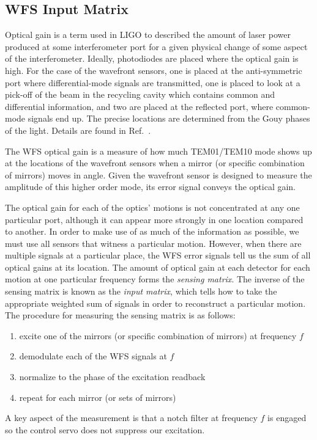 


\subsection{WFS Input Matrix}
Optical gain is a term used in LIGO to described the amount of laser
power produced at some interferometer port for a given physical change
of some aspect of the interferometer. Ideally, photodiodes are placed
where the optical gain is high. For the case of the wavefront sensors,
one is placed at the anti-symmetric port where differential-mode
signals are transmitted, one is placed to look at a pick-off of the
beam in the recycling cavity which contains common and differential
information, and two are placed at the reflected port, where
common-mode signals end up. The precise locations are determined from
the Gouy phases of the light. Details are found in
Ref.~\cite{Barsotti2009Modeling}. 

The WFS optical gain is a measure of how much TEM01/TEM10 mode shows
up at the locations of the wavefront sensors when a mirror (or
specific combination of mirrors) moves in angle. Given the wavefront
sensor is designed to measure the amplitude of this higher order mode,
its error signal conveys the optical gain.

The optical gain for each of the optics' motions is not concentrated
at any one particular port, although it can appear more strongly in
one location compared to another. In order to make use of as much of
the information as possible, we must use all sensors that witness a
particular motion. However, when there are multiple signals at a
particular place, the WFS error signals tell us the sum of all optical
gains at its location. The amount of optical gain at each detector for
each motion at one particular frequency forms the \emph{sensing
  matrix}. The inverse of the sensing matrix is known as the
\emph{input matrix}, which tells how to take the appropriate weighted
sum of signals in order to reconstruct a particular motion. The
procedure for measuring the sensing matrix is as follows:
\begin{enumerate}
\item excite one of the mirrors (or specific combination of mirrors)
  at frequency $f$ \vspace{-10pt}
\item demodulate each of the WFS signals at $f$ \vspace{-10pt}
\item normalize to the phase of the excitation readback \vspace{-10pt}
\item repeat for each mirror (or sets of mirrors)
\end{enumerate}
A key aspect of the measurement is that a notch filter at frequency
$f$ is engaged so the control servo does not suppress our excitation.

